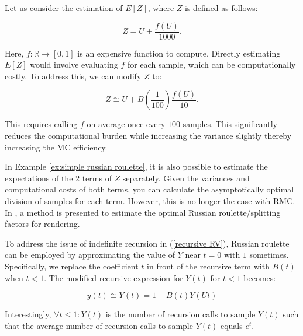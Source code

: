 \documentclass[a4paper,12pt]{article}
\begin{document}
\begin{example} \label{ex:simple russian roulette}
  Let us consider the estimation of $E[Z]$, where $Z$ is defined as follows:

  \begin{equation}
    Z = U + \frac{f(U)}{1000}.
  \end{equation}

  Here, $f:\mathbb{R} \rightarrow [0,1]$ is an expensive function to compute.
  Directly estimating $E[Z]$ would involve evaluating $f$ for each sample,
  which can be computationally costly. To address this, we can modify $Z$ to:

  \begin{equation}
    Z \cong U + B\left(\frac{1}{100}\right)\frac{f(U)}{10}.
  \end{equation}

  This requires calling $f$ on
  average once every $100$ samples. This significantly reduces the
  computational burden while increasing the variance slightly thereby increasing
  the MC efficiency.\\
\end{example}

\begin{related}
  In Example \ref{ex:simple russian roulette}, it is also
  possible to estimate the expectations of the $2$ terms
  of $Z$ separately. Given the variances and computational costs
  of both terms, you can calculate the asymptotically optimal division
  of samples for each term. However, this is no longer the case with RMC.
  In \cite{rath_ears_2022}, a method is presented to estimate the optimal
  Russian roulette/splitting factors for rendering.
\end{related}


\begin{example} \label{ex: russian roulette}
  To address the issue of indefinite recursion in
  (\ref{recursive RV}), Russian roulette can be employed
  by approximating the value of $Y$ near $t = 0$ with $1$
  sometimes. Specifically, we replace the coefficient $t$
  in front of the recursive term with $B(t)$ when $t < 1$.
  The modified recursive expression for $Y(t)$ for $t<1$ becomes:

  \begin{equation}\label{eq:rr example}
    y(t) \cong Y(t) = 1 + B(t)Y(Ut)
  \end{equation}

  Interestingly, $\forall t \le 1:Y(t)$ is the number of recursion calls
  to sample $Y(t)$ such that the average number of recursion
  calls to sample $Y(t)$ equals $e^{t}$.

\end{example}
\end{document}
